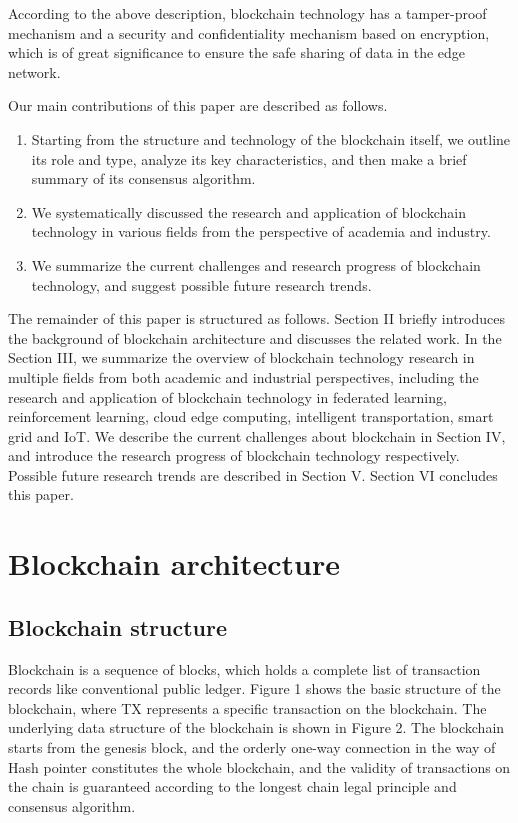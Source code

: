 \documentclass[lettersize,journal]{IEEEtran}
\begin{document}
According to the above description, blockchain technology has a tamper-proof mechanism and a security and confidentiality mechanism based on encryption, which is of great significance to ensure the safe sharing of data in the edge network.

Our main contributions of this paper are described as follows.
\begin{enumerate}

\item Starting from the structure and technology of the blockchain itself, we outline its role and type, analyze its key characteristics, and then make a brief summary of its consensus algorithm.

\item We systematically discussed the research and application of blockchain technology in various fields from the perspective of academia and industry.

\item We summarize the current challenges and research progress of blockchain technology, and suggest possible future research trends.

\end{enumerate}

The remainder of this paper is structured as follows. Section II briefly introduces the background of blockchain architecture and discusses the related work. In the Section III, we summarize the overview of blockchain technology research in multiple fields from both academic and industrial perspectives, including the research and application of blockchain technology in federated learning, reinforcement learning, cloud edge computing, intelligent transportation, smart grid and IoT. We describe the current challenges about blockchain in Section IV, and introduce the research progress of blockchain technology respectively. Possible future research trends are described in Section V. Section VI concludes this paper.
\section{Blockchain architecture}
\subsection{Blockchain structure}
Blockchain is a sequence of blocks, which holds a complete list of transaction records like conventional public ledger. Figure 1 shows the basic structure of the blockchain, where TX represents a specific transaction on the blockchain. The underlying data structure of the blockchain is shown in Figure 2. The blockchain starts from the genesis block, and the orderly one-way connection in the way of Hash pointer constitutes the whole blockchain, and the validity of transactions on the chain is guaranteed according to the longest chain legal principle and consensus algorithm.
\end{document}
